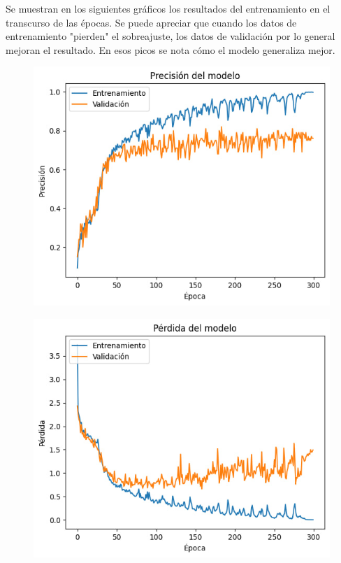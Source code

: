 \documentclass[colorinlistoftodos,twoside,twocolumn,10pt]{article} %
\begin{document}
Se muestran en los siguientes gráficos los resultados del entrenamiento en el transcurso de las épocas. Se puede apreciar que cuando los datos de entrenamiento "pierden" el sobreajuste, los datos de validación por lo general mejoran el resultado. En esos picos se nota cómo el modelo generaliza mejor.
  \begin{figure}
  \includegraphics{CNN_accuracy.jpg}
  \end{figure}
  \begin{figure}
  \includegraphics{CNN_loss.jpg}
  \end{figure}
\end{document}
